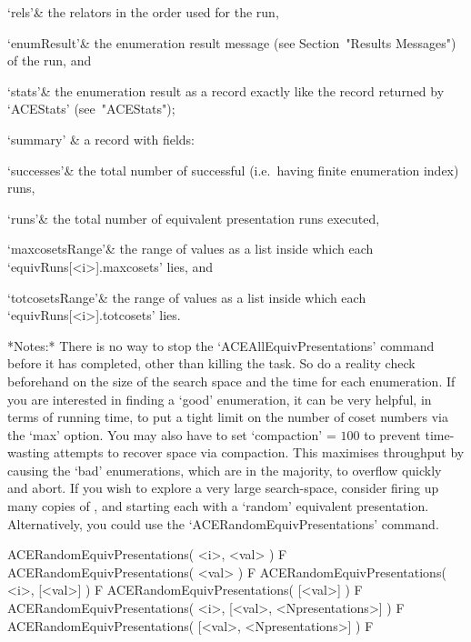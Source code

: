 \beginitems

\quad\quad`rels'& the relators in the order used for the run,

\quad\quad`enumResult'& the {\ACE}  enumeration  result  message  (see
Section~"Results Messages") of the run, and

\quad\quad`stats'& the enumeration result as a {\GAP}  record  exactly
like the record returned by `ACEStats' (see~"ACEStats");

\enditems

\quad`summary' & a record with fields:

\beginitems
\quad\quad`successes'& the total  number  of  successful  (i.e.~having
finite enumeration index) runs,

\quad\quad`runs'& the total number  of  equivalent  presentation  runs
executed,

\quad\quad`maxcosetsRange'& the range  of  values  as  a  {\GAP}  list
inside which each `equivRuns[<i>].maxcosets' lies, and

\quad\quad`totcosetsRange'& the range  of  values  as  a  {\GAP}  list
inside which each `equivRuns[<i>].totcosets' lies.

\enditems

\enditems

*Notes:*
There is no way to stop the `ACEAllEquivPresentations' command  before
it has completed, other than killing the task. So do a  reality  check
beforehand on the size of the search  space  and  the  time  for  each
enumeration.  If  you  are  interested   in   finding   a   \lq{}good'
enumeration, it can be very helpful, in terms of running time, to  put
a tight limit on the number of coset numbers via the `max' option. You
may also have to set `compaction'  =  $100$  to  prevent  time-wasting
attempts to recover space via compaction. This maximises throughput by
causing the \lq{}bad' enumerations, which  are  in  the  majority,  to
overflow quickly and abort. If  you  wish  to  explore  a  very  large
search-space, consider firing up many copies of {\ACE},  and  starting
each with a \lq{}random' equivalent presentation.  Alternatively,  you
could use the `ACERandomEquivPresentations' command.


\>ACERandomEquivPresentations( <i>, <val> ) F
\>ACERandomEquivPresentations( <val> ) F
\>ACERandomEquivPresentations( <i>, [<val>] ) F
\>ACERandomEquivPresentations( [<val>] ) F
\>ACERandomEquivPresentations( <i>, [<val>, <Npresentations>] ) F
\>ACERandomEquivPresentations( [<val>, <Npresentations>] ) F


